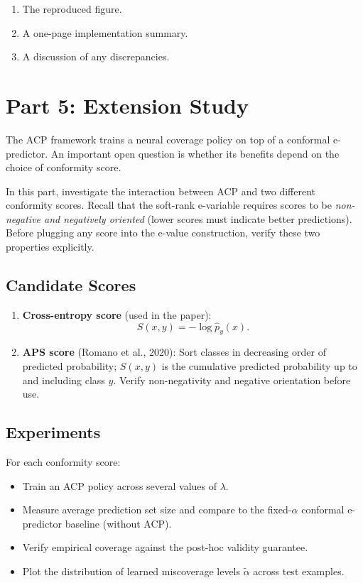 \documentclass[11pt]{article}
\begin{document}
\begin{enumerate}[label=\arabic*.]
  \item The reproduced figure.
  \item A one-page implementation summary.
  \item A discussion of any discrepancies.
\end{enumerate}

\section{Part 5: Extension Study}

The ACP framework trains a neural coverage policy on top of a
conformal e-predictor. An important open question is whether its benefits
depend on the choice of conformity score.

In this part, investigate the interaction between ACP and two different
conformity scores. Recall that the soft-rank e-variable requires scores to
be \emph{non-negative and negatively oriented} (lower scores must indicate
better predictions). Before plugging any score into the e-value construction,
verify these two properties explicitly.

\subsection{Candidate Scores}

\begin{enumerate}

\item \textbf{Cross-entropy score} (used in the paper):
\[
  S(x,y) = -\log \hat p_y(x).
\]

\item \textbf{APS score} (Romano et al., 2020): Sort classes in decreasing
order of predicted probability; $S(x,y)$ is the cumulative predicted
probability up to and including class $y$. Verify non-negativity and
negative orientation before use.

\end{enumerate}

\subsection{Experiments}

For each conformity score:
\begin{itemize}
  \item Train an ACP policy across several values of $\lambda$.
  \item Measure average prediction set size and compare to the fixed-$\alpha$
  conformal e-predictor baseline (without ACP).
  \item Verify empirical coverage against the post-hoc validity guarantee.
  \item Plot the distribution of learned miscoverage levels $\tilde\alpha$
  across test examples.
\end{itemize}
\end{document}
